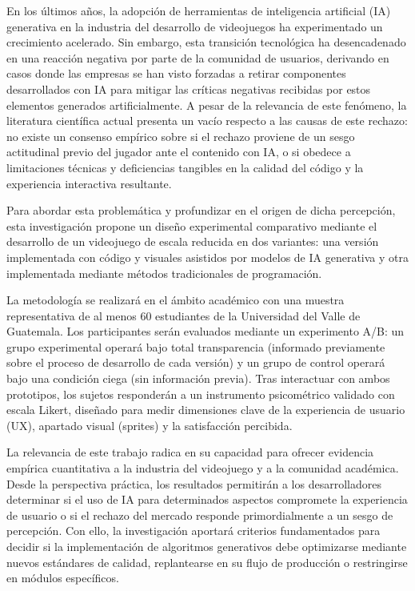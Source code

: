 En los últimos años, la adopción de herramientas de inteligencia artificial (IA) generativa en la industria del desarrollo de videojuegos ha experimentado un crecimiento acelerado. Sin embargo, esta transición tecnológica ha desencadenado en una reacción negativa por parte de la comunidad de usuarios, derivando en casos donde las empresas se han visto forzadas a retirar componentes desarrollados con IA para mitigar las críticas negativas recibidas por estos elementos generados artificialmente. A pesar de la relevancia de este fenómeno, la literatura científica actual presenta un vacío respecto a las causas de este rechazo: no existe un consenso empírico sobre si el rechazo proviene de un sesgo actitudinal previo del jugador ante el contenido con IA, o si obedece a limitaciones técnicas y deficiencias tangibles en la calidad del código y la experiencia interactiva resultante.

Para abordar esta problemática y profundizar en el origen de dicha percepción, esta investigación propone un diseño experimental comparativo mediante el desarrollo de un videojuego de escala reducida en dos variantes: una versión implementada con código y visuales asistidos por modelos de IA generativa y otra implementada mediante métodos tradicionales de programación. 

La metodología se realizará en el ámbito académico con una muestra representativa de al menos 60 estudiantes de la Universidad del Valle de Guatemala. Los participantes serán evaluados mediante un experimento A/B: un grupo experimental operará bajo total transparencia (informado previamente sobre el proceso de desarrollo de cada versión) y un grupo de control operará bajo una condición ciega (sin información previa). Tras interactuar con ambos prototipos, los sujetos responderán a un instrumento psicométrico validado con escala Likert, diseñado para medir dimensiones clave de la experiencia de usuario (UX), apartado visual (sprites) y la satisfacción percibida.

La relevancia de este trabajo radica en su capacidad para ofrecer evidencia empírica cuantitativa a la industria del videojuego y a la comunidad académica. Desde la perspectiva práctica, los resultados permitirán a los desarrolladores determinar si el uso de IA para determinados aspectos compromete la experiencia de usuario o si el rechazo del mercado responde primordialmente a un sesgo de percepción. Con ello, la investigación aportará criterios fundamentados para decidir si la implementación de algoritmos generativos debe optimizarse mediante nuevos estándares de calidad, replantearse en su flujo de producción o restringirse en módulos específicos.